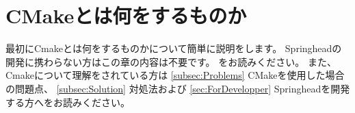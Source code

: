 \newpage
\section{CMakeとは何をするものか}
\label{sec:WhatCMakeWillDo}

\def\Anno#1{\mc{\footnotesize{ \CDots\  #1}}}
\def\SolutionFile{\hbox{ソリューションファイル
	{\raise 1.2ex\hbox{\scriptsize (}}%
	\raise.3ex\hbox{\small{$^\dagger$}}%
	{\raise 1.2ex\hbox{\scriptsize )}}%
}}
\def\ProjectFile{\hbox{プロジェクトファイル
	{\raise 1.2ex\hbox{\scriptsize (}}%
	\raise.4ex\hbox{\small{$^\ddagger$}}%
	{\raise 1.2ex\hbox{\scriptsize )}}%
}}
\def\cmake{\tt{cmake}}
\def\make{\tt{make}}
\def\SprLib{Springheadライブラリ}
\def\SprProj{Springheadプロジェクト}
\def\VS{Visual Studio}

\def\SprTop#1{\Path{C:/Springhead{#1}}}
\def\AppTop#1{\Path{C:/Develop/Application{#1}}}
\def\build{{\it{build\/}}}

\def\CMakeLists#1{\Path{CMakeLists.txt{#1}}}
\def\CMakeOpts#1{\Path{CMakeOpts.txt{#1}}}
\def\CMakeConf#1{\Path{CMakeConf.txt{#1}}}
\def\CMakeTopdir#1{\Path{CMakeTopdir.txt{#1}}}

\def\thinrule#1{\makebox[#1][l]{\vrule width #1 height 0.1pt}}


\noindent
最初にCmakeとは何をするものかについて簡単に説明をします。
Springheadの開発に携わらない方はこの章の内容は不要です。
をお読みください。
また、Cmakeについて理解をされている方は
\UpKQs \ref{subsec:Problems} CMakeを使用した場合の問題点\UpKQe、
\UpKQs \ref{subsec:Solution} 対処法\UpKQe および
\UpKQs \ref{sec:ForDevelopper} Springheadを開発する方へ\UpKQe をお読みください。

